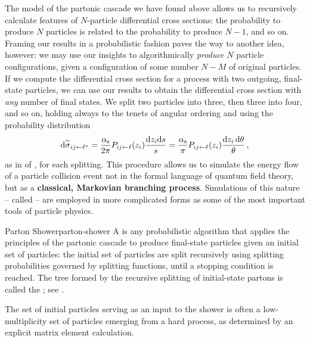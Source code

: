 The model of the partonic cascade we have found above allows us to recursively calculate features of \(N\)-particle differential cross sections:
%
the probability to produce \(N\) particles is related to the probability to produce \(N-1\), and so on.
%
Framing our results in a probabilistic fashion paves the way to another idea, however:
%
we may use our insights to algorithmically \textit{produce} \(N\) particle configurations, given a configuration of some number \(N-M\) of original particles.
%
If we compute the differential cross section for a process with two outgoing, final-state particles, we can use our results to obtain the differential cross section with \textit{any} number of final states.
%
We split two particles into three, then three into four, and so on, holding always to the tenets of angular ordering and using the probability distribution
\begin{align}
    \label{eq:splitting-prob-ch3}
    \dsigmatilde_{ij \leftarrow \ell^*}
    =
    \frac{\alphas}{2\pi}
    P_{ij \leftarrow \ell}(z_i) \frac{\dd z_i \dd s}{s}
    =
    \frac{\alphas}{\pi}
    P_{ij \leftarrow \ell}(z_i) \frac{\dd z_i \, \dd \theta}{\theta}
    \,,
\end{align}
as in  of , for each splitting.
%
This procedure allows us to simulate the energy flow of a particle collision event not in the formal language of quantum field theory, but as a \textbf{classical, Markovian branching process}.
%
Simulations of this nature -- called  -- are employed in more complicated forms as some of the most important tools of particle physics.


\begin{definitionbox}{Parton Shower}{parton-shower}
    A  is any probabilistic algorithm that applies the principles of the partonic cascade to produce final-state particles given an initial set of particles:
    the initial set of particles are split recursively using splitting probabilities governed by splitting functions, until a stopping condition is reached.
    The tree formed by the recursive splitting of initial-state partons is called the ;
    see .

    The set of initial particles serving as an input to the shower is often a low-multiplicity set of particles emerging from a hard process, as determined by an explicit matrix element calculation.
\end{definitionbox}


